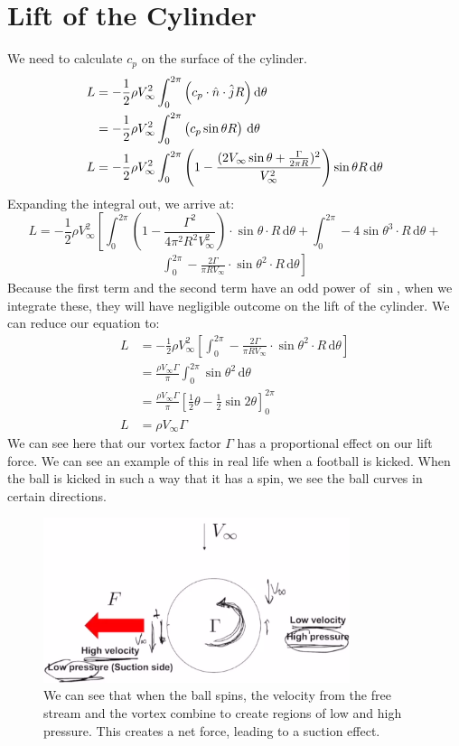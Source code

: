 \documentclass[class=report, crop=false, 12pt,a4paper]{standalone}
\begin{document}
\section{Lift of the Cylinder}
We need to calculate $c_p$ on the surface of the cylinder.
\begin{align}
  L &= -\frac{1}{2}\rho V_{\infty}^2\int_{0}^{2\pi} \left(c_p \cdot \hat{n}\cdot\hat{j}R\right)\dif \theta \\
  &= - \frac{1}{2}\rho V_{\infty}^2 \int_{0}^{2\pi} \left(c_p \sin\theta R\right) \,\mathrm{d}\theta \\
  L &= -\frac{1}{2}\rho V_{\infty}^2 \int_{0}^{2\pi} \left(1-\frac{(2V_{\infty}\sin\theta + \frac{\Gamma}{2\pi R})^2}{V_{\infty}^2}\right) \sin\theta R \,\mathrm{d}\theta 
\end{align}
Expanding the integral out, we arrive at:
$$
  L = -\frac{1}{2} \rho V_\infty^2 \left[ \int_{0}^{2\pi} \left(1 - \frac{\Gamma^2}{4\pi^2R^2V_\infty^2}\right)\cdot \sin{\theta} \cdot R \,\mathrm{d}\theta + \int_{0}^{2\pi} -4\sin{\theta}^3 \cdot R \,\mathrm{d}\theta + \right.
$$
\begin{align}
  \left. \int_{0}^{2\pi} -\frac{2\Gamma}{\pi RV_\infty}\cdot \sin{\theta}^2 \cdot R \,\mathrm{d}\theta \right]
\end{align}
Because the first term and the second term have an odd power of $\sin{}$, when we integrate these, they will have negligible outcome on the lift of the cylinder. We can reduce our equation to:
\begin{align}
  L &= -\frac{1}{2} \rho V_\infty^2 \left[ \int_{0}^{2\pi} -\frac{2\Gamma}{\pi RV_\infty}\cdot \sin{\theta}^2 \cdot R \,\mathrm{d}\theta \right]\\
  &= \frac{\rho V_\infty \Gamma}{\pi} \int_{0}^{2\pi} \sin{\theta}^2 \,\mathrm{d}\theta \\
  &= \frac{\rho V_\infty \Gamma}{\pi} \left[ \frac{1}{2}\theta - \frac{1}{2}\sin{2\theta} \right]_0^{2\pi}\\
  L &= \rho V_\infty \Gamma 
\end{align}
We can see here that our vortex factor $\Gamma$ has a proportional effect on our lift force. We can see an example of this in real life when a football is kicked. When the ball is kicked in such a way that it has a spin, we see the ball curves in certain directions.
\begin{figure}[H]
  \centering
  \includegraphics[width = 0.8\textwidth]{../img/diagram26.png}
  \caption{We can see that when the ball spins, the velocity from the free stream and the vortex combine to create regions of low and high pressure. This creates a net force, leading to a suction effect.}
\end{figure}
\end{document}
